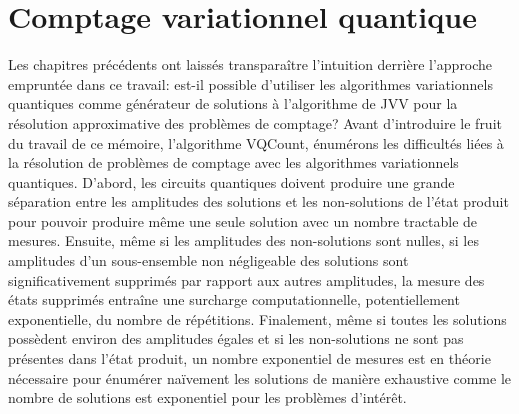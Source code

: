 \chapter{Comptage variationnel quantique}
\label{cha:comptage-variationnel-quantique}

Les chapitres précédents ont laissés transparaître l'intuition derrière l'approche empruntée dans ce travail: est-il possible d'utiliser les algorithmes variationnels quantiques comme générateur de solutions à l'algorithme de JVV pour la résolution approximative des problèmes de comptage? Avant d'introduire le fruit du travail de ce mémoire, l'algorithme VQCount, énumérons les difficultés liées à la résolution de problèmes de comptage avec les algorithmes variationnels quantiques. D'abord, les circuits quantiques doivent produire une grande séparation entre les amplitudes des solutions et les non-solutions de l'état produit pour pouvoir produire même une seule solution avec un nombre tractable de mesures. Ensuite, même si les amplitudes des non-solutions sont nulles, si les amplitudes d'un sous-ensemble non négligeable des solutions sont significativement supprimés par rapport aux autres amplitudes, la mesure des états supprimés entraîne une surcharge computationnelle, potentiellement exponentielle, du nombre de répétitions. Finalement, même si toutes les solutions possèdent environ des amplitudes égales et si les non-solutions ne sont pas présentes dans l'état produit, un nombre exponentiel de mesures est en théorie nécessaire pour énumérer naïvement les solutions de manière exhaustive comme le nombre de solutions est exponentiel pour les problèmes d'intérêt.

